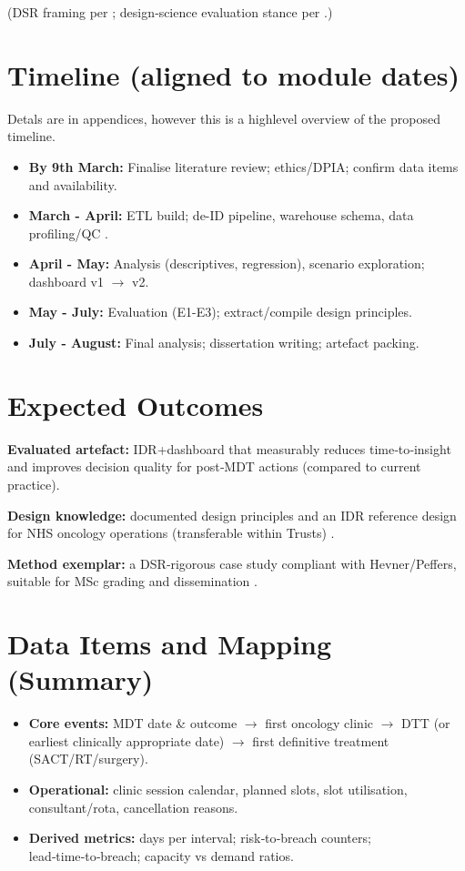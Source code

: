 \documentclass[12pt, a4paper, twoside]{article} %
\begin{document}
(DSR framing per \cite{Peffers2007}; design‑science evaluation stance per \cite{hevner2004}.) 

\section{Timeline (aligned to module dates)}
Detals are in appendices, however this is a highlevel overview of the proposed timeline. 
\begin{itemize}
  \item \textbf{By 9th March:} Finalise literature review; ethics/DPIA; confirm data items and availability.
  \item \textbf{March - April:} ETL build; de-ID pipeline, warehouse schema, data profiling/QC \citep{gagalova2020}.
  \item \textbf{April - May:} Analysis (descriptives, regression), scenario exploration; dashboard v1 $\rightarrow$ v2.
  \item \textbf{May - July:} Evaluation (E1-E3); extract/compile design principles.
  \item \textbf{July - August:} Final analysis; dissertation writing; artefact packing.
\end{itemize}


\section{Expected Outcomes}

\textbf{Evaluated artefact:} IDR+dashboard that measurably reduces time‑to‑insight and improves decision quality for post‑MDT actions (compared to current practice).

\textbf{Design knowledge:} documented design principles and an IDR reference design for NHS oncology operations (transferable within Trusts) \citep{gagalova2020}.

\textbf{Method exemplar:} a DSR‑rigorous case study compliant with Hevner/Peffers, suitable for MSc grading and dissemination \citep{hevner2004, Peffers2007}. 



\appendix
\section{Data Items and Mapping (Summary)}
\begin{itemize}
  \item \textbf{Core events:} MDT date \& outcome $\rightarrow$ first oncology clinic $\rightarrow$  DTT (or earliest clinically appropriate date) $\rightarrow$  first definitive treatment (SACT/RT/surgery).
  \item \textbf{Operational:} clinic session calendar, planned slots, slot utilisation, consultant/rota, cancellation reasons.
  \item \textbf{Derived metrics:} days per interval; risk‑to‑breach counters; lead‑time‑to‑breach; capacity vs demand ratios.
\end{itemize}
\end{document}
